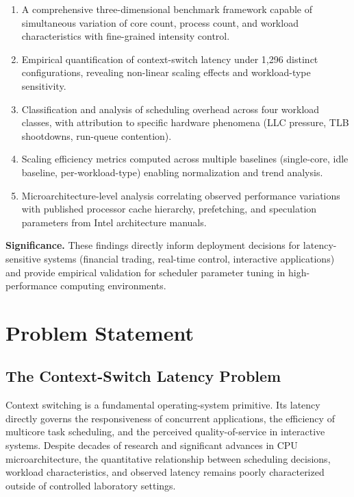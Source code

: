 \documentclass[conference]{IEEEtran}
\begin{document}
\begin{enumerate}
  \item A comprehensive three-dimensional benchmark framework capable of
        simultaneous variation of core count, process count, and workload
        characteristics with fine-grained intensity control.
  
  \item Empirical quantification of context-switch latency under 1,296 distinct
        configurations, revealing non-linear scaling effects and workload-type
        sensitivity.
  
  \item Classification and analysis of scheduling overhead across four workload
        classes, with attribution to specific hardware phenomena (LLC pressure,
        TLB shootdowns, run-queue contention).
  
  \item Scaling efficiency metrics computed across multiple baselines
        (single-core, idle baseline, per-workload-type) enabling normalization
        and trend analysis.
  
  \item Microarchitecture-level analysis correlating observed performance
        variations with published processor cache hierarchy, prefetching, and
        speculation parameters from Intel architecture manuals.
\end{enumerate}

\textbf{Significance.}
These findings directly inform deployment decisions for latency-sensitive
systems (financial trading, real-time control, interactive applications) and
provide empirical validation for scheduler parameter tuning in high-performance
computing environments.

\section{Problem Statement}
\label{sec:problem}

\subsection{The Context-Switch Latency Problem}

Context switching is a fundamental operating-system primitive. Its latency
directly governs the responsiveness of concurrent applications, the efficiency
of multicore task scheduling, and the perceived quality-of-service in
interactive systems. Despite decades of research and significant advances in
CPU microarchitecture, the quantitative relationship between scheduling
decisions, workload characteristics, and observed latency remains poorly
characterized outside of controlled laboratory settings.
\end{document}
